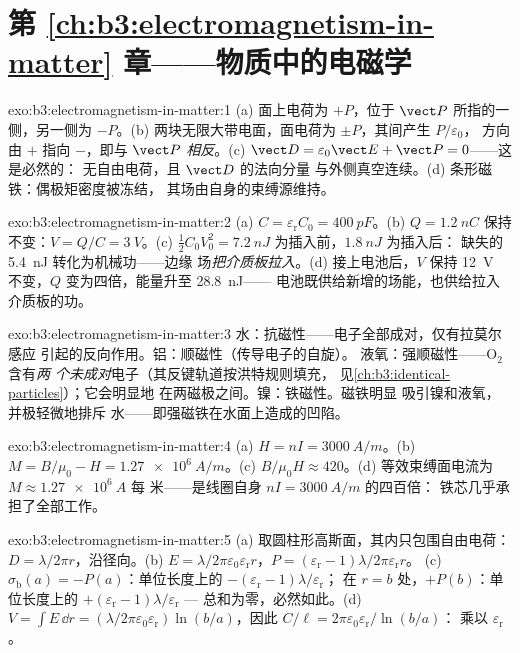 \section*{第 \ref{ch:b3:electromagnetism-in-matter} 章——物质中的电磁学}

\begin{solution}{exo:b3:electromagnetism-in-matter:1}
(a) 面上电荷为 $+P$，位于 $\vect P$ 所指的一侧，另一侧为 $-P$。(b)
两块无限大带电面，面电荷为 $\pm P$，其间产生 $P/\varepsilon_0$，
方向由 $+$ 指向 $-$，即与 $\vect P$ \emph{相反}。(c)
$\vect D = \varepsilon_0\vect E + \vect P = 0$——这是必然的：
无自由电荷，且 $\vect D$ 的法向分量
与外侧真空连续。(d) 条形磁铁：偶极矩密度被冻结，
其场由自身的束缚源维持。
\end{solution}

\begin{solution}{exo:b3:electromagnetism-in-matter:2}
(a) $C = \varepsilon_{\text{r}}C_0 = \qty{400}{pF}$。(b) $Q =
\qty{1.2}{nC}$ 保持不变：$V = Q/C = \qty{3}{V}$。(c)
$\tfrac12C_0V_0^2 = \qty{7.2}{nJ}$ 为插入前，$\qty{1.8}{nJ}$ 为插入后：
缺失的 \qty{5.4}{nJ} 转化为机械功——边缘
场\emph{把介质板拉入}。(d) 接上电池后，$V$ 保持
\qty{12}{V} 不变，$Q$ 变为四倍，能量升至 \qty{28.8}{nJ}——
电池既供给新增的场能，也供给拉入介质板的功。
\end{solution}

\begin{solution}{exo:b3:electromagnetism-in-matter:3}
水：抗磁性——电子全部成对，仅有拉莫尔感应
引起的反向作用。铝：顺磁性（传导电子的自旋）。
液氧：强顺磁性——O$_2$ 含有\emph{两
个未成对}电子（其反键轨道按洪特规则填充，
见\cref{ch:b3:identical-particles}）；它会明显地
在两磁极之间。镍：铁磁性。磁铁明显
吸引镍和液氧，并极轻微地排斥
水——即强磁铁在水面上造成的凹陷。
\end{solution}

\begin{solution}{exo:b3:electromagnetism-in-matter:4}
(a) $H = nI = \qty{3000}{A/m}$。(b) $M = B/\mu_0 - H =
\qty{1.27e6}{A/m}$。(c) $B/\mu_0H \approx 420$。(d)
等效束缚面电流为 $M \approx \qty{1.27e6}{A}$ 每
米——是线圈自身 $nI = \qty{3000}{A/m}$ 的四百倍：
铁芯几乎承担了全部工作。
\end{solution}

\begin{solution}{exo:b3:electromagnetism-in-matter:5}
(a) 取圆柱形高斯面，其内只包围自由电荷：
$D = \lambda/2\pi r$，沿径向。(b) $E =
\lambda/2\pi\varepsilon_0\varepsilon_{\text{r}}r$，$P =
(\varepsilon_{\text{r}}-1)\lambda/2\pi\varepsilon_{\text{r}}r$。
(c) $\sigma_{\text{b}}(a) = -P(a)$：单位长度上的
$-(\varepsilon_{\text{r}}-1)\lambda/\varepsilon_{\text{r}}$；
在 $r = b$ 处，$+P(b)$：单位长度上的
$+(\varepsilon_{\text{r}}-1)\lambda/\varepsilon_{\text{r}}$ ---
总和为零，必然如此。(d) $V = \int E\,\dd r =
(\lambda/2\pi\varepsilon_0\varepsilon_{\text{r}})\ln(b/a)$，因此
$C/\ell = 2\pi\varepsilon_0\varepsilon_{\text{r}}/\ln(b/a)$：
乘以 $\varepsilon_{\text{r}}$。
\end{solution}

